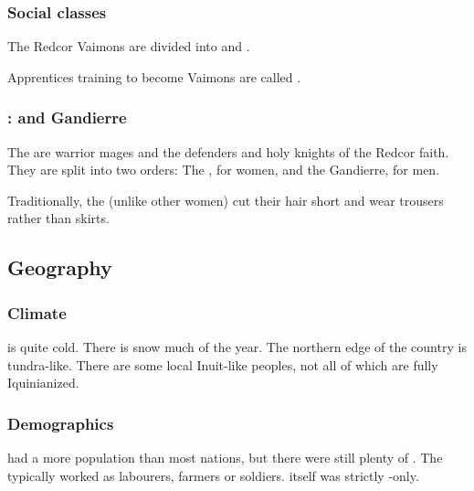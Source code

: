 \subsubsection{Social classes}
The Redcor Vaimons are divided into \clerics{} and \templars{}. 

Apprentices training to become Vaimons are called \neophytes.\index{\neophyte}





\subsubsection{\Templars: \Ryzin{} and Gandierre}
The \templars{} are warrior mages and the defenders and holy knights of the Redcor faith. 
They are split into two orders: 
The {\Ryzin}, for women, and the {Gandierre}, for men. 

Traditionally, the \Ryzin{} (unlike other \Redcean{} women) cut their hair short and wear trousers rather than skirts. 









\subsection{Geography}





\subsubsection{Climate}
\Redce{} is quite cold. 
There is snow much of the year. 
The northern edge of the country is tundra-like. 
There are some local Inuit-like peoples, not all of which are fully Iquinianized. 





\subsubsection{Demographics}
\Redce had a more \human population than most nations, but there were still plenty of \scathae.
The \scathae typically worked as labourers, farmers or soldiers. 
\ClanRedcor itself was strictly \human-only. 





